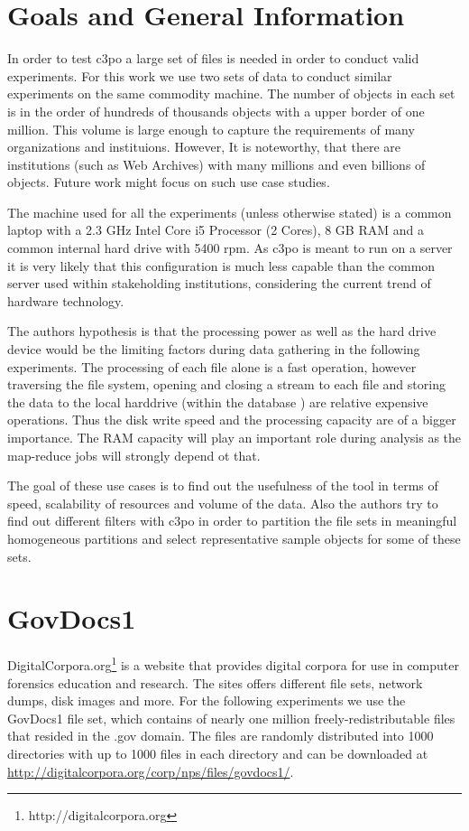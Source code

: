 \section{Goals and General Information}
In order to test c3po a large set of files is needed in order to conduct valid experiments.
For this work we use two sets of data to conduct similar experiments on the same commodity machine. The number of objects in each set is in the order of hundreds of thousands objects with a upper border of one million. This volume is large enough to capture the requirements of many organizations and instituions. However, It is noteworthy, that there are institutions (such as Web Archives) with many millions and even billions of objects. Future work might focus on such use case studies.

The machine used for all the experiments (unless otherwise stated) is a common laptop with a 2.3 GHz Intel Core i5 Processor (2 Cores), 8 GB RAM and a common internal hard drive with 5400 rpm. As c3po is meant to run on a server it is very likely that this configuration is much less capable than the common server used within stakeholding institutions, considering the current trend of hardware technology.

The authors hypothesis is that the processing power as well as the hard drive device would be the limiting factors during data gathering in the following experiments. The  processing of each file alone is a fast operation, however traversing the file system, opening and closing a stream to each file and storing the data to the local harddrive (within the database ) are relative expensive operations. Thus the disk write speed and the processing capacity are of a bigger importance. The RAM capacity will play an important role during analysis as the map-reduce jobs will strongly depend ot that.

The goal of these use cases is to find out the usefulness of the tool in terms of speed, scalability of resources and volume of the data. Also the authors try to find out different filters with c3po in order to partition the file sets in meaningful homogeneous partitions and select representative sample objects for some of these sets.


\section{GovDocs1}
DigitalCorpora.org\footnote{http://digitalcorpora.org} is a website that provides digital corpora for use in computer forensics education and research. The sites offers different file sets, network dumps, disk images and more. For the following experiments we use the GovDocs1 file set, which contains of nearly one million freely-redistributable files that resided in the .gov domain.
The files are randomly distributed into 1000 directories with up to 1000 files in each directory and can be downloaded at \url{http://digitalcorpora.org/corp/nps/files/govdocs1/}.

